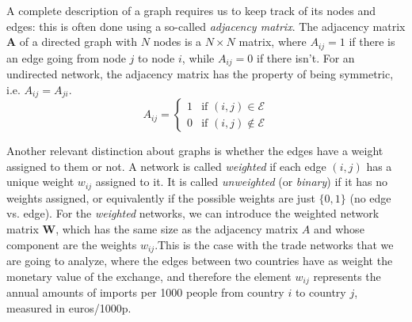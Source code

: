 A complete description of a graph requires us to keep track of its nodes and edges: this is often done using a so-called \textit{adjacency matrix}. The adjacency matrix $\mathbf{A}$ of a directed graph with $N$ nodes is a $N \times N$ matrix, where $A_{ij} = 1$ if there is an edge going from node $j$ to node $i$, while $A_{ij} = 0$ if there isn't. For an undirected network, the adjacency matrix has the property of being symmetric, i.e. $A_{ij} = A_{ji}$.
\begin{equation}
    A_{ij} = \begin{cases}
        1 & \text{if } (i,j) \in \mathcal{E} \\
        0 & \text{if } (i,j) \notin \mathcal{E}
    \end{cases}
\end{equation}

Another relevant distinction about graphs is whether the edges have a weight assigned to them or not. A network is called \textit{weighted} if each edge $(i,j)$ has a unique weight $w_{ij}$ assigned to it. It is called \textit{unweighted} (or \textit{binary}) if it has no weights assigned, or equivalently if the possible weights are just $\{0,1\}$ (no edge vs. edge). For the \textit{weighted} networks, we can introduce the weighted network matrix $\mathbf{W}$, which has the same size as the adjacency matrix $A$ and whose component are the weights $w_{ij}$.This is the case with the trade networks that we are going to analyze, where the edges between two countries have as weight the monetary value of the exchange, and therefore the element $w_{ij}$ represents the annual amounts of imports per 1000 people from country $i$ to country $j$, measured in euros/1000p.


